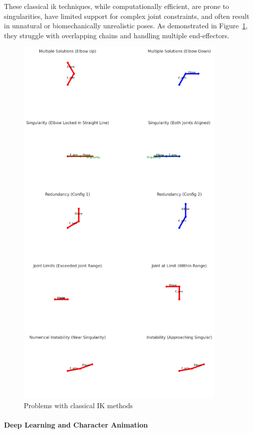 \documentclass[../../main.tex]{subfiles}
\begin{document}
These classical \gls{ik} techniques, while computationally efficient, are prone to singularities, have limited support for complex joint constraints, and often result in unnatural or biomechanically unrealistic poses. As demonstrated in Figure~\ref{fig:problems_classical}, they struggle with overlapping chains and handling multiple end-effectors.

\begin{figure}
  \centering \includegraphics[width = 4in]{chapters/background_work/images/problems_classical.png}
  \caption{Problems with classical IK methods}
  \label{fig:problems_classical}
\end{figure}

\paragraph{Deep Learning and Character Animation}
\label{ch:background_work:sign_language_synthesis:3d_techniques:avatar_animation:deep_learning}
\end{document}
